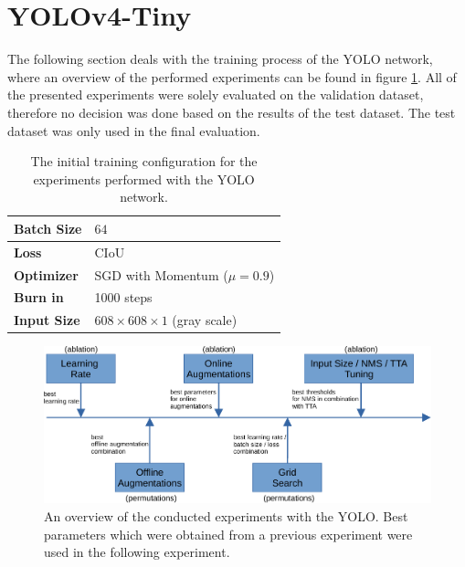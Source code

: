 \section{YOLOv4-Tiny}
\label{sec:training_yolo}


The following section deals with the training process of the \ac{YOLO} network, where an overview of the performed experiments can be found in figure \ref{fig:yolo_experiments_overview}.
All of the presented experiments were solely evaluated on the validation dataset, therefore no decision was done based on the results of the test dataset.
The test dataset was only used in the final evaluation.

\begin{table}[b!]
\footnotesize
\begin{center}
\begin{tabular}{|l|l|}

\hline
\textbf{Batch Size} & $64$\\
\hline
\textbf{Loss} & \ac{CIoU} \\
\hline
\textbf{Optimizer} & \ac{SGD} with Momentum ($\mu = 0.9$)\\
\hline
\textbf{Burn in} & 1000 steps \\
\hline
\textbf{Input Size} & $608 \times 608 \times 1$ (gray scale) \\
\hline

\end{tabular}
\caption{The initial training configuration for the experiments performed with the YOLO network.}
\label{tab:initial_yolo_config}
\end{center}
\end{table}

\begin{figure}[t!]
\begin{center}
    \includegraphics[width=14cm]{imgs/experiments_overview_yolo.pdf}
    \caption{An overview of the conducted experiments with the \ac{YOLO}. Best parameters which were obtained from a previous experiment were used in the following experiment.}
    \label{fig:yolo_experiments_overview}
\end{center}
\end{figure}

